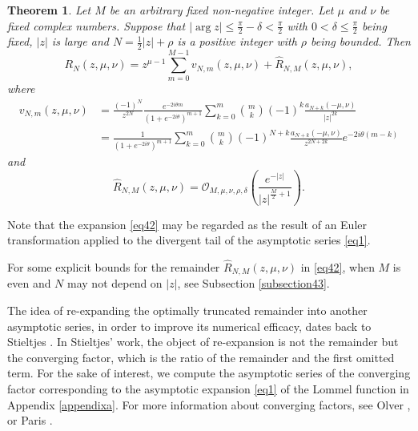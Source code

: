 \documentclass[a4paper,twoside,10pt]{amsart}
\newtheorem{theorem}{Theorem}[section]
\numberwithin{equation}{section}
\begin{document}
\begin{theorem}\label{thm4} Let $M$ be an arbitrary fixed non-negative integer. Let $\mu$ and $\nu$ be fixed complex numbers. Suppose that $\left|\arg z\right| \leq \frac{\pi}{2}-\delta < \frac{\pi}{2}$ with $0<\delta \leq \frac{\pi}{2}$ being fixed, $\left|z\right|$ is large and $N = \frac{1}{2}\left|z\right|+\rho$ is a positive integer with $\rho$ being bounded. Then
\begin{equation}\label{eq42}
R_{N} \left( {z,\mu ,\nu } \right) = z^{\mu - 1} \sum\limits_{m = 0}^{M - 1} {v_{N,m} \left( {z,\mu ,\nu } \right)}  + \widehat R_{N,M} \left( {z,\mu ,\nu } \right),
\end{equation}
where
\begin{align*}
v_{N,m} \left( {z,\mu ,\nu } \right) & = \frac{\left( { - 1} \right)^N}{z^{2N}} \frac{{e^{ - 2i\theta m} }}{{\left( {1 + e^{ - 2i\theta } } \right)^{m + 1} }}\sum\limits_{k = 0}^m {\binom{m}{k}\left( { - 1} \right)^k \frac{{a_{N + k} \left( { - \mu ,\nu } \right)}}{{\left| z \right|^{2k} }}} 
\\ & = \frac{1}{{\left( {1 + e^{ - 2i\theta } } \right)^{m + 1} }}\sum\limits_{k = 0}^m {\binom{m}{k}\left( { - 1} \right)^{N + k} \frac{{a_{N + k} \left( { - \mu ,\nu } \right)}}{{z^{2N + 2k} }}e^{ - 2i\theta \left( {m - k} \right)} }
\end{align*}
and
\begin{equation}\label{eq52}
\widehat R_{N,M} \left( {z,\mu ,\nu } \right) = \mathcal{O}_{M,\mu ,\nu ,\rho,\delta } \left( {\frac{{e^{ - \left| z \right|} }}{{\left| z \right|^{\frac{M}{2} + 1} }}} \right).
\end{equation}
\end{theorem}

Note that the expansion \eqref{eq42} may be regarded as the result of an Euler transformation \cite[p. 537]{Olver} applied to the divergent tail of the asymptotic series \eqref{eq1}.

For some explicit bounds for the remainder $\widehat R_{N,M} \left( {z,\mu ,\nu } \right)$ in \eqref{eq42}, when $M$ is even and $N$ may not depend on $\left|z\right|$, see Subsection \ref{subsection43}.

The idea of re-expanding the optimally truncated remainder into another asymptotic series, in order to improve its numerical efficacy, dates back to Stieltjes \cite{Stieltjes}. In Stieltjes' work, the object of re-expansion is not the remainder but the converging factor, which is the ratio of the remainder and the first omitted term. For the sake of interest, we compute the asymptotic series of the converging factor corresponding to the asymptotic expansion \eqref{eq1} of the Lommel function in Appendix \ref{appendixa}. For more information about converging factors, see Olver \cite{Olver3}, \cite[pp. 522--536]{Olver} or Paris \cite[pp. 85--89]{Paris}.
\end{document}

